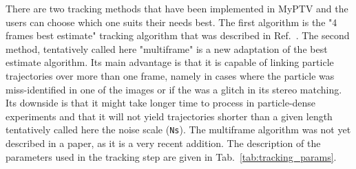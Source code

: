 \documentclass[10pt,a4paper]{article}
\begin{document}
There are two tracking methods that have been implemented in MyPTV and the users can choose which one suits their needs best. The first algorithm is the "4 frames best estimate" tracking algorithm that was described in Ref.~\cite{Ouellette2006}. The second method, tentatively called here "multiframe" is a new adaptation of the best estimate algorithm. Its main advantage is that it is capable of linking particle trajectories over more than one frame, namely in cases where the particle was miss-identified in one of the images or if the was a glitch in its stereo matching. Its downside is that it might take longer time to process in particle-dense experiments and that it will not yield trajectories shorter than a given length tentatively called here the noise scale (\texttt{Ns}). The multiframe algorithm was not yet described in a paper, as it is a very recent addition. The description of the parameters used in the tracking step are given in Tab.~\ref{tab:tracking_params}. 
\end{document}
